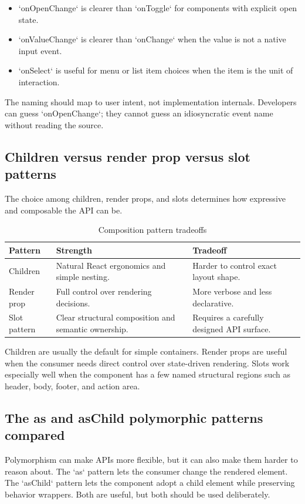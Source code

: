 \begin{itemize}[leftmargin=*, itemsep=0.35em]
  \item `onOpenChange` is clearer than `onToggle` for components with explicit open state.
  \item `onValueChange` is clearer than `onChange` when the value is not a native input event.
  \item `onSelect` is useful for menu or list item choices when the item is the unit of interaction.
\end{itemize}

The naming should map to user intent, not implementation internals. Developers can guess `onOpenChange`; they cannot guess an idiosyncratic event name without reading the source.

\subsection{Children versus render prop versus slot patterns}
The choice among children, render props, and slots determines how expressive and composable the API can be.

\begin{table}[htbp]
  \centering
  \caption{Composition pattern tradeoffs}
  \begin{tabularx}{\textwidth}{@{}p{}p{}Y@{}}
    \toprule
    \textbf{Pattern} & \textbf{Strength} & \textbf{Tradeoff} \\
    \midrule
    Children & Natural React ergonomics and simple nesting. & Harder to control exact layout shape. \\
    Render prop & Full control over rendering decisions. & More verbose and less declarative. \\
    Slot pattern & Clear structural composition and semantic ownership. & Requires a carefully designed API surface. \\
    \bottomrule
  \end{tabularx}
\end{table}

Children are usually the default for simple containers. Render props are useful when the consumer needs direct control over state-driven rendering. Slots work especially well when the component has a few named structural regions such as header, body, footer, and action area.

\subsection{The as and asChild polymorphic patterns compared}
Polymorphism can make APIs more flexible, but it can also make them harder to reason about. The `as` pattern lets the consumer change the rendered element. The `asChild` pattern lets the component adopt a child element while preserving behavior wrappers. Both are useful, but both should be used deliberately.

